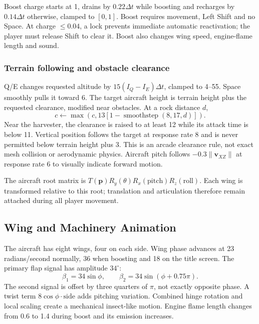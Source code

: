 Boost charge starts at 1, drains by $0.22\Delta t$ while boosting and recharges by $0.14\Delta t$ otherwise, clamped to $[0,1]$. Boost requires movement, Left Shift and no Space. At charge $\le0.04$, a lock prevents immediate automatic reactivation; the player must release Shift to clear it. Boost also changes wing speed, engine-flame length and sound.

\subsubsection{Terrain following and obstacle clearance}
Q/E changes requested altitude by $15(I_Q-I_E)\Delta t$, clamped to 4--55. Space smoothly pulls it toward 6. The target aircraft height is terrain height plus the requested clearance, modified near obstacles. At a rock distance $d$,
\begin{equation}
c\leftarrow\max\left(c,13[1-\operatorname{smoothstep}(8,17,d)]\right).
\end{equation}
Near the harvester, the clearance is raised to at least 12 while its attack time is below 11. Vertical position follows the target at response rate 8 and is never permitted below terrain height plus 3. This is an arcade clearance rule, not exact mesh collision or aerodynamic physics. Aircraft pitch follows $-0.3\|\mathbf v_{XZ}\|$ at response rate 6 to visually indicate forward motion.

The aircraft root matrix is $T(\mathbf p)R_y(\theta)R_x(\mathrm{pitch})R_z(\mathrm{roll})$. Each wing is transformed relative to this root; translation and articulation therefore remain attached during all player movement.

\subsection{Wing and Machinery Animation}
The aircraft has eight wings, four on each side. Wing phase advances at 23 radians/second normally, 36 when boosting and 18 on the title screen. The primary flap signal has amplitude $34^\circ$:
\begin{equation}
\beta_1=34\sin\phi,\qquad \beta_2=34\sin(\phi+0.75\pi).
\end{equation}
The second signal is offset by three quarters of $\pi$, not exactly opposite phase. A twist term $8\cos\phi\cdot\mathrm{side}$ adds pitching variation. Combined hinge rotation and local scaling create a mechanical insect-like motion. Engine flame length changes from 0.6 to 1.4 during boost and its emission increases.

